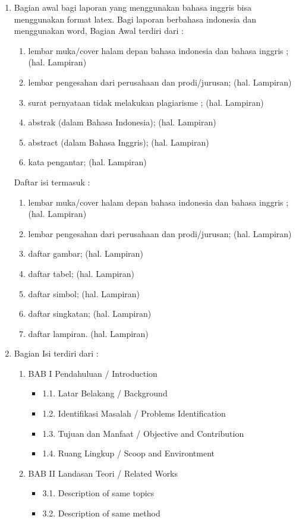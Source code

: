 \begin{enumerate}
\item
Bagian awal bagi laporan yang menggunakan bahasa inggris bisa menggunakan format latex. Bagi laporan berbahasa indonesia dan menggunakan word, Bagian Awal terdiri dari :
\begin{enumerate}
\item lembar muka/cover halam depan bahasa indonesia dan bahasa inggris ; (hal. Lampiran)
\item lembar pengesahan dari perusahaan dan prodi/jurusan; (hal. Lampiran) 
\item surat pernyataan tidak melakukan plagiarisme ; (hal. Lampiran)
\item abstrak (dalam Bahasa Indonesia); (hal. Lampiran)
\item abstract (dalam Bahasa Inggris); (hal. Lampiran)
\item kata pengantar; (hal. Lampiran)
\end{enumerate}
Daftar isi termasuk :
\begin{enumerate}
\item lembar muka/cover halam depan bahasa indonesia dan bahasa inggris ; (hal. Lampiran)
\item lembar pengesahan dari perusahaan dan prodi/jurusan; (hal. Lampiran) 
\item	daftar gambar; (hal. Lampiran)
\item	daftar tabel; (hal. Lampiran)
\item	daftar simbol; (hal. Lampiran)
\item	daftar singkatan; (hal. Lampiran)
\item	daftar lampiran. (hal. Lampiran) 

\end{enumerate}


\item
Bagian Isi terdiri dari :
\begin{enumerate}
\item BAB I Pendahuluan / Introduction
\begin{itemize}
\item 1.1.	Latar Belakang / Background
\item 1.2.	Identifikasi Masalah / Problems Identification
\item 1.3.	Tujuan dan Manfaat / Objective and Contribution
\item 1.4.	Ruang Lingkup / Scoop and Environtment
\end{itemize}
\item BAB II Landasan Teori / Related Works
\begin{itemize}
\item 3.1.	Description of same topics
\item 3.2.	Description of same method
\end{itemize}


\end{enumerate}
\end{enumerate}
